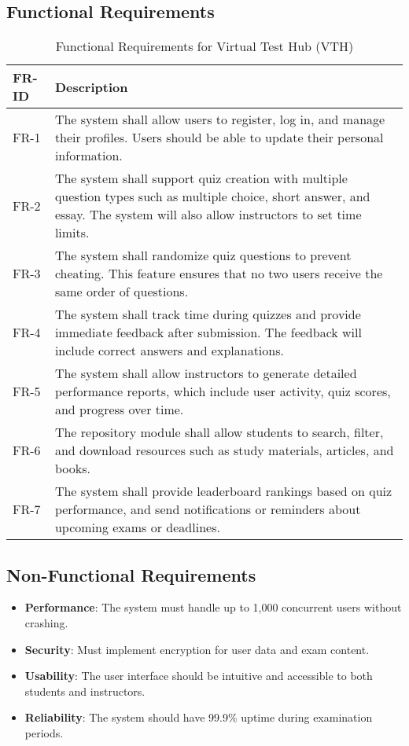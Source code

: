 \documentclass{article}
\begin{document}
	\subsection{Functional Requirements}
	\begin{table}[h!]
		\centering
		\begin{tabular}{| m{2cm} | m{5cm} |}
			\hline
			\textbf{FR-ID} & \textbf{Description} \\
			\hline
			FR-1 & The system shall allow users to register, log in, and manage their profiles. Users should be able to update their personal information. \\
			\hline
			FR-2 & The system shall support quiz creation with multiple question types such as multiple choice, short answer, and essay. The system will also allow instructors to set time limits. \\
			\hline
			FR-3 & The system shall randomize quiz questions to prevent cheating. This feature ensures that no two users receive the same order of questions. \\
			\hline
			FR-4 & The system shall track time during quizzes and provide immediate feedback after submission. The feedback will include correct answers and explanations. \\
			\hline
			FR-5 & The system shall allow instructors to generate detailed performance reports, which include user activity, quiz scores, and progress over time. \\
			\hline
			FR-6 & The repository module shall allow students to search, filter, and download resources such as study materials, articles, and books. \\
			\hline
			FR-7 & The system shall provide leaderboard rankings based on quiz performance, and send notifications or reminders about upcoming exams or deadlines. \\
			\hline
		\end{tabular}
		\caption{Functional Requirements for Virtual Test Hub (VTH)}
	\end{table}
	
	\subsection{Non-Functional Requirements}
	\begin{itemize}
		\item \textbf{Performance}: The system must handle up to 1,000 concurrent users without crashing.
		\item \textbf{Security}: Must implement encryption for user data and exam content.
		\item \textbf{Usability}: The user interface should be intuitive and accessible to both students and instructors.
		\item \textbf{Reliability}: The system should have 99.9\% uptime during examination periods.
	\end{itemize}
	
\end{document}
